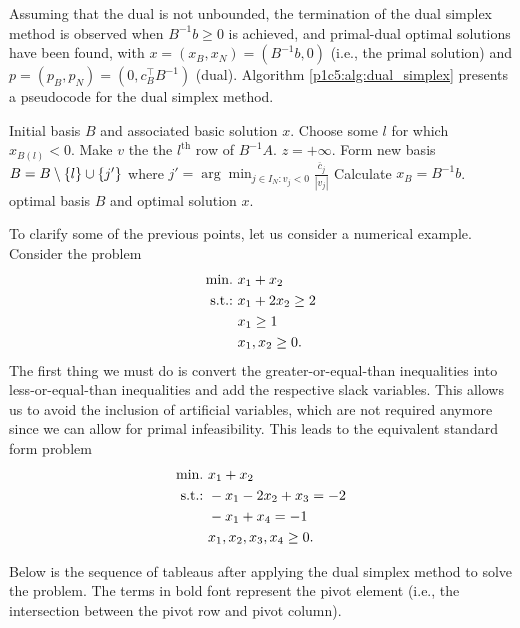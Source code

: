 Assuming that the dual is not unbounded, the termination of the dual simplex method is observed when $B^{-1}b \geq 0$ is achieved, and primal-dual optimal solutions have been found, with $x = (x_B,x_N) = (B^{-1}b, 0)$ (i.e., the primal solution) and $p = (p_B, p_N) = (0, c_B^\top B^{-1})$ (dual). Algorithm \ref{p1c5:alg:dual_simplex} presents a pseudocode for the dual simplex method.

\begin{algorithm}[h]
	\caption{Dual simplex method} \label{p1c5:alg:dual_simplex}
	\begin{algorithmic}[1] %
		 Initial basis $B$ and associated basic solution $x$.
		 \label{alg:opt_condition} 
			\State Choose some $l$ for which $x_{B(l)} < 0$. Make $v$ the the $l^\text{th}$ row of $B^{-1}A$. 
			 \label{alg:unb_condition}
				 $z = +\infty$.		
			\Else
				\State Form new basis $B = B \setminus \left\{ l \right \} \cup \left\{ j' \right \}$ where $j' = \arg\min_{j \in I_N : v_j < 0} \frac{\overline{c}_j}{|v_j|}$ 
				\State Calculate $x_B = B^{-1}b$.
			\EndIf
		\EndWhile
		 optimal basis $B$ and optimal solution $x$.
	\end{algorithmic}
\end{algorithm}

To clarify some of the previous points, let us consider a numerical example. Consider the problem 
%
\begin{align*}
	\mathop{\text{min.~}} &x_1 + x_2 \\
	\mathop{\text{s.t.:~}} &x_1 + 2x_2 \geq 2 \\
	&x_1 \geq  1 \\
	&x_1,x_2 \geq 0.	
\end{align*}	
%
The first thing we must do is convert the greater-or-equal-than inequalities into less-or-equal-than inequalities and add the respective slack variables. This allows us to avoid the inclusion of artificial variables, which are not required anymore since we can allow for primal infeasibility. This leads to the equivalent standard form problem
%
\begin{align*}
	\mathop{\text{min.~}} &x_1 + x_2 \\
	\mathop{\text{s.t.:~}} &-x_1 - 2x_2 + x_3 = -2 \\
	&-x_1 + x_4 = -1 \\
	&x_1,x_2,x_3,x_4 \geq 0.	
\end{align*}

Below is the sequence of tableaus after applying the dual simplex method to solve the problem. The terms in bold font represent the pivot element (i.e., the intersection between the pivot row and pivot column). 

